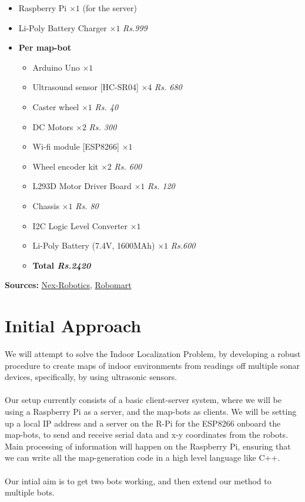 \documentclass[12pt]{article}
\begin{document}
\begin{itemize}
    \item
		Raspberry Pi $\times 1$ (for the server)
	\item
		Li-Poly Battery Charger $\times 1$ \hfill \textit{Rs.999}
    \item
        \textbf{Per map-bot}
        \begin{itemize}
        \item
            Arduino Uno $\times 1$
        \item
			Ultrasound sensor [HC-SR04] $\times 4$ \hfill \textit{Rs. 680}
        \item
            Caster wheel $\times 1$ \hfill \textit{Rs. 40}
        \item
            DC Motors $\times 2$ \hfill \textit{Rs. 300}
        \item
            Wi-fi module [ESP8266] $\times 1$
        \item
            Wheel encoder kit $\times 2$ \hfill \textit{Rs. 600}
        \item
            L293D Motor Driver Board $\times 1$ \hfill \textit{Rs. 120}
        \item
            Chassis $\times 1$ \hfill \textit{Rs. 80}
        \item
            I2C Logic Level Converter $\times 1$
		\item
			Li-Poly Battery (7.4V, 1600MAh) $\times 1$ \hfill \textit{Rs.600}
		\item
			\textbf{Total \hfill \textit{Rs.2420}}
        \end{itemize}
\end{itemize}

\textbf{Sources:} \href{http://www.nex-robotics.com}{Nex-Robotics}, \href{https://www.robomart.com/}{Robomart}

\section{Initial Approach}

We will attempt to solve the Indoor Localization Problem, by developing a robust procedure to create maps of indoor environments from readings off multiple sonar devices, specifically, by using ultrasonic sensors.\\
\\
Our setup currently consists of a basic client-server system, where we will be using a Raspberry Pi as a server, and the map-bots as clients. 
We will be setting up a local IP address and a server on the R-Pi for the ESP8266 onboard the map-bots, to send and receive serial data and 
x-y coordinates from the robots. Main processing of information will happen on the Raspberry Pi, ensuring that we can write all the 
map-generation code in a high level language like C++.\\
\\
Our intial aim is to get two bots working, and then extend our method to multiple bots.
\end{document}
